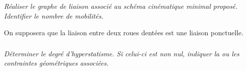 \documentclass[10pt,fleqn]{article} %
\begin{document}
\begin{multicols}{2}
\subparagraph{}
\textit{Réaliser le graphe de liaison associé au schéma cinématique minimal proposé. Identifier le nombre de mobilités. }
\ifprof
\begin{corrige}
\end{corrige}\else\fi

On supposera que la liaison entre deux roues dentées est une liaison ponctuelle. 


\subparagraph{}
\textit{Déterminer le degré d'hyperstatisme. Si celui-ci est non nul, indiquer la ou les contraintes géométriques associées. }
\ifprof
\begin{corrige}
\end{corrige}\else\fi


\end{multicols}
\end{document}
